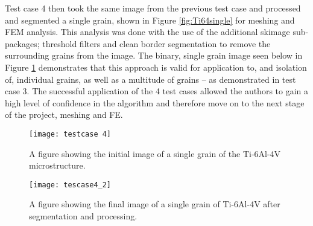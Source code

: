 \documentclass[\report.tex]{subfiles}
\begin{document}
\noindent Test case 4 then took the same image from the previous test case and processed and segmented a single grain, shown in Figure \ref{fig:Ti64single} for meshing and FEM analysis. This analysis was done with the use of the additional skimage sub-packages; threshold filters and clean border segmentation to remove the surrounding grains from the image. The binary, single grain image seen below in Figure \ref{fig:Ti64single2} demonstrates that this approach is valid for application to, and isolation of, individual grains, as well as a multitude of grains -- as demonstrated in test case 3. The successful application of the 4 test cases allowed the authors to gain a high level of confidence in the algorithm and therefore move on to the next stage of the project, meshing and FE.\\

\begin{figure}[!htb]
  \centering
  \begin{minipage}[!htb]{.5\textwidth}
    \centering\captionsetup{width=.8\linewidth}%
    \texttt{[image: testcase 4]}
    \caption{A figure showing the initial image of a single grain of the Ti-6Al-4V microstructure.}\label{fig:Ti64single}
  \end{minipage}%
  \begin{minipage}[!htb]{.5\textwidth}
    \centering\captionsetup{width=.8\linewidth}%
    \texttt{[image: tescase4\_2]}
    \caption{A figure showing the final image of a single grain of Ti-6Al-4V after segmentation and processing.}\label{fig:Ti64single2}
  \end{minipage}
\end{figure}
\end{document}
